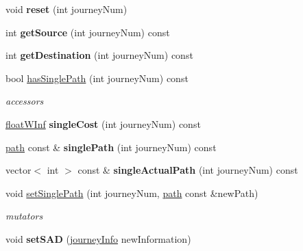 \begin{DoxyCompactItemize}
\item 
\hypertarget{classjourneyGroup_a3659e96ce0929680b6fa2338fff4bcc7}{
void {\bfseries reset} (int journeyNum)}
\label{classjourneyGroup_a3659e96ce0929680b6fa2338fff4bcc7}

\item 
\hypertarget{classjourneyGroup_a61760e1d31b091dc4d8c264cd8ee0085}{
int {\bfseries getSource} (int journeyNum) const }
\label{classjourneyGroup_a61760e1d31b091dc4d8c264cd8ee0085}

\item 
\hypertarget{classjourneyGroup_ae1bd6f0c0d25dcc773c7cf4b22ae416d}{
int {\bfseries getDestination} (int journeyNum) const }
\label{classjourneyGroup_ae1bd6f0c0d25dcc773c7cf4b22ae416d}

\item 
\hypertarget{classjourneyGroup_a6106a60747c418c55aad8f55c22ecd8f}{
bool \hyperlink{classjourneyGroup_a6106a60747c418c55aad8f55c22ecd8f}{hasSinglePath} (int journeyNum) const }
\label{classjourneyGroup_a6106a60747c418c55aad8f55c22ecd8f}

\begin{DoxyCompactList}\small\item\em accessors \end{DoxyCompactList}\item 
\hypertarget{classjourneyGroup_a090ed700dc75f7eb34d8a22ec79a64da}{
\hyperlink{classfloatWInf}{floatWInf} {\bfseries singleCost} (int journeyNum) const }
\label{classjourneyGroup_a090ed700dc75f7eb34d8a22ec79a64da}

\item 
\hypertarget{classjourneyGroup_a5a2806f64b3dae07acfe428dbde2f075}{
\hyperlink{classpath}{path} const \& {\bfseries singlePath} (int journeyNum) const }
\label{classjourneyGroup_a5a2806f64b3dae07acfe428dbde2f075}

\item 
\hypertarget{classjourneyGroup_af3d7cd1584e249ae21fdcabd05f8472f}{
vector$<$ int $>$ const \& {\bfseries singleActualPath} (int journeyNum) const }
\label{classjourneyGroup_af3d7cd1584e249ae21fdcabd05f8472f}

\item 
\hypertarget{classjourneyGroup_ae70103bd1f197f1d48ae8c9aaddc1d32}{
void \hyperlink{classjourneyGroup_ae70103bd1f197f1d48ae8c9aaddc1d32}{setSinglePath} (int journeyNum, \hyperlink{classpath}{path} const \&newPath)}
\label{classjourneyGroup_ae70103bd1f197f1d48ae8c9aaddc1d32}

\begin{DoxyCompactList}\small\item\em mutators \end{DoxyCompactList}\item 
\hypertarget{classjourneyGroup_a44972c06b63d6bcfa21084d6e8c5fa8c}{
void {\bfseries setSAD} (\hyperlink{classjourneyInfo}{journeyInfo} newInformation)}
\label{classjourneyGroup_a44972c06b63d6bcfa21084d6e8c5fa8c}


\end{DoxyCompactItemize}
